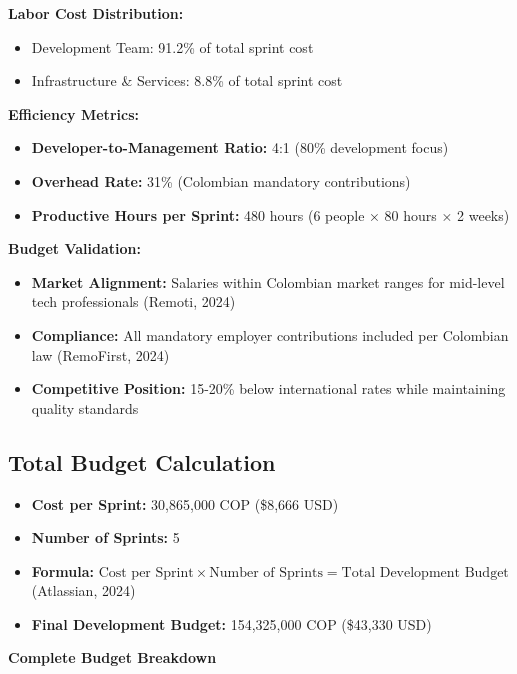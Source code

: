 \documentclass[12pt,a4paper]{article}
\begin{document}
\textbf{Labor Cost Distribution:}
\begin{itemize}
    \item Development Team: 91.2\% of total sprint cost
    \item Infrastructure \& Services: 8.8\% of total sprint cost
\end{itemize}

\textbf{Efficiency Metrics:}
\begin{itemize}
    \item \textbf{Developer-to-Management Ratio:} 4:1 (80\% development focus)
    \item \textbf{Overhead Rate:} 31\% (Colombian mandatory contributions)
    \item \textbf{Productive Hours per Sprint:} 480 hours (6 people × 80 hours × 2 weeks)
\end{itemize}

\textbf{Budget Validation:}
\begin{itemize}
    \item \textbf{Market Alignment:} Salaries within Colombian market ranges for mid-level tech professionals (Remoti, 2024)
    \item \textbf{Compliance:} All mandatory employer contributions included per Colombian law (RemoFirst, 2024)
    \item \textbf{Competitive Position:} 15-20\% below international rates while maintaining quality standards
\end{itemize}

\subsection{Total Budget Calculation}

\begin{itemize}
    \item \textbf{Cost per Sprint:} 30,865,000 COP (\$8,666 USD)
    \item \textbf{Number of Sprints:} 5
    \item \textbf{Formula:} $\text{Cost per Sprint} \times \text{Number of Sprints} = \text{Total Development Budget}$ (Atlassian, 2024)
    \item \textbf{Final Development Budget:} 154,325,000 COP (\$43,330 USD)
\end{itemize}

\textbf{Complete Budget Breakdown}
\end{document}
